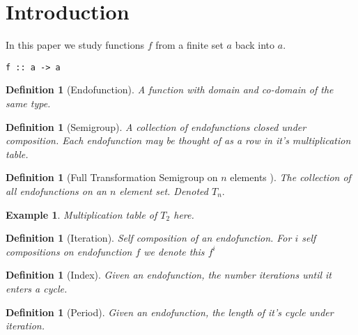 \documentclass{article}
\newtheorem{defn}[thm]{Definition}
\newtheorem{exam}[thm]{Example}
\begin{document}
\maketitle

\begin{abstract}
We examine properties of endofunctions on a finite set under general an self-composition (iteration). Using this technique we derive an optimal search strategy for black box subgroup detection. We also gain insight into the complxity of boolean matrix multiplication, the complexity of integer factorization, and the structure of compositional equality relations.
\end{abstract}

\section{Introduction}

In this paper we study functions $f$ from a finite set $a$ back into $a$.

\begin{lstlisting}
f :: a -> a 
\end{lstlisting}


\begin{defn}[Endofunction] A function with domain and co-domain of the same type.\end{defn}
\begin{defn}[Semigroup] A collection of endofunctions closed under composition. Each endofunction may be thought of as a row in it's multiplication table. \end{defn}
\begin{defn}[Full Transformation Semigroup on $n$ elements ] The collection of all endofunctions on an $n$ element set. Denoted $T_{n}.$\end{defn}

\begin{exam} Multiplication table of $T_{2}$ here.\end{exam}

\begin{defn}[Iteration] Self composition of an endofunction. For $i$ self compositions on endofunction $f$ we denote this $f^{i}$\end{defn}

\begin{defn}[Index] Given an endofunction, the number iterations until it enters a cycle.\end{defn}
\begin{defn}[Period] Given an endofunction, the length of it's cycle under iteration.\end{defn}
\end{document}
